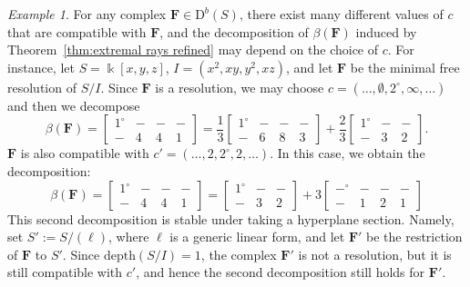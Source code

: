 \documentclass[12pt]{amsart}
\theoremstyle{definition}
\theoremstyle{remark}
\newtheorem{example}[lemma]{Example}
\newcommand{\kk}{\Bbbk}
\newcommand{\bb}{c}
\newcommand{\FF}{\mathbf{F}}
\newcommand{\zp}{\circ}
\newcommand{\nothing}{\emptyset}
\newcommand{\DD}{\mathrm{D}}
\begin{document}
\begin{example}
For any complex $\FF\in \DD^b(S)$, there exist many different values of $\bb$ that are compatible with $\FF$, and the decomposition of $\beta(\FF)$ induced by Theorem~\ref{thm:extremal rays refined} may depend on the choice of $\bb$.   For instance, let $S=\kk[x,y,z]$, $I=(x^2,xy,y^2,xz)$, and let $\FF$ be the minimal free resolution of $S/I$.  Since $\FF$ is a resolution, we may choose $\bb=(\dots, \nothing, 2^\zp, \infty, \dots)$ and then we decompose
\[
\beta(\FF)=\begin{bmatrix}
1^\zp&-&-&-\\
-&4&4&1
\end{bmatrix}
=
\frac{1}{3}
\begin{bmatrix}
1^\zp&-&-&-\\
-&6&8&3
\end{bmatrix}
+\frac{2}{3}
\begin{bmatrix}
1^\zp&-&-\\
-&3&2
\end{bmatrix}.
\]
$\FF$ is also compatible with $\bb'=(\dots, 2, 2^\zp, 2, \dots)$.  In this case, we obtain the decomposition:
\[
\beta(\FF)=
\begin{bmatrix}
1^\zp&-&-&-\\
-&4&4&1
\end{bmatrix}
=\begin{bmatrix}1^\zp&-&-\\-&3&2\end{bmatrix}
+
3\begin{bmatrix}
-^\zp&-&-&-\\
-&1&2&1
\end{bmatrix}
\] 
This second decomposition is stable under taking a hyperplane section.  Namely, set $S':=S/(\ell)$, where $\ell$ is a generic linear form, and let $\FF'$ be the restriction of $\FF$ to $S'$.  Since $\text{depth}(S/I)=1$, the complex $\FF'$ is not a resolution, but it is still compatible with $\bb'$, and hence the second decomposition still holds for $\FF'$.
\end{example}
\end{document}
